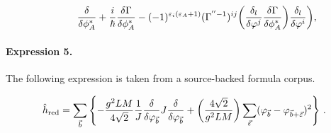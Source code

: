 \documentclass[11pt]{article}
\begin{document}
\begin{align*}\rule{.9cm}{0cm} \frac{\delta}{\delta\phi^*_A}+ \frac{i}{\hbar}\frac{\delta\Gamma}{\delta\phi^*_A} -(-1)^{\varepsilon_i(\varepsilon_A+1)}(\Gamma^{''-1})^{ij} \bigg(\frac{\delta_l}{\delta\varphi^j}\frac{\delta\Gamma}{\delta\phi^*_A} \bigg)\frac{\delta_l}{\delta\varphi^i}\bigg),\end{align*}

\paragraph{Expression 5.} The following expression is taken from a source-backed formula corpus.

\begin{align*}\hat h_{\rm red} = \sum_{\vec{b}}\left\{-\frac{g^2 LM}{4\sqrt2}\frac{1}{J}\frac{\delta}{\delta\varphi_{\vec b}} J\frac{\delta}{\delta\varphi _{\vec b}}+\left(\frac{4\sqrt2}{g^2LM}\right) \sum_{\vec{\varepsilon}}(\varphi_{\vec b}-\varphi_{\vec b+\vec\varepsilon})^2\right\} \, .\end{align*}
\end{document}
